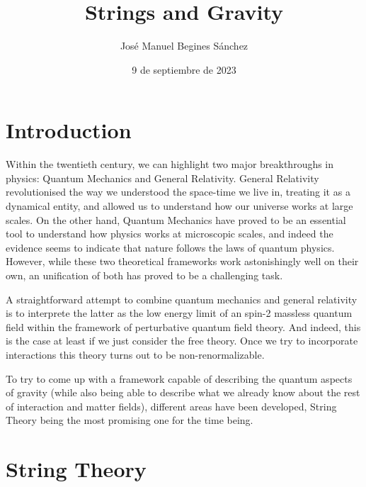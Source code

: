 \documentclass[12pt]{article}
\title{\vspace{-2cm}Strings and Gravity}
\author{José Manuel Begines Sánchez}
\date{9 de septiembre de 2023}
\begin{document}
\maketitle

\section{Introduction}

Within the twentieth century, we can highlight two major breakthroughs in physics: Quantum Mechanics and General Relativity. General Relativity revolutionised the way we understood the space-time we live in, treating it as a dynamical entity, and allowed us to understand how our universe works at large scales. On the other hand, Quantum Mechanics have proved to be an essential tool to understand how physics works at microscopic scales, and indeed the evidence seems to indicate that nature follows the laws of quantum physics. However, while these two theoretical frameworks work astonishingly well on their own, an unification of both has proved to be a challenging task.

A straightforward attempt to combine quantum mechanics and general relativity is to interprete the latter as the low energy limit of an spin-2 massless quantum field within the framework of perturbative quantum field theory. And indeed, this is the case at least if we just consider the free theory. Once we try to incorporate interactions this theory turns out to be non-renormalizable.

To try to come up with a framework capable of describing the quantum aspects of gravity (while also being able to describe what we already know about the rest of interaction and matter fields), different areas have been developed, String Theory being the most promising one for the time being.

\section{String Theory}
\end{document}
